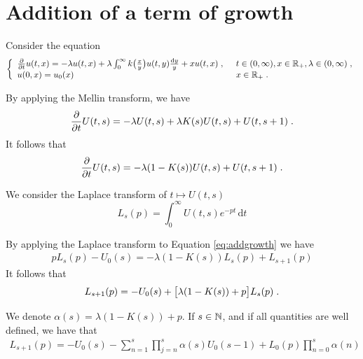 \documentclass[11pt]{amsart}
\newcommand{\diff}{\,\mathrm{d}}
\begin{document}
\section{Addition of a term of growth}

Consider the equation
\begin{equation*}\left\{
    \begin{array}{ll}
	\frac{\partial}{\partial t}u(t,x) = - \lambda u(t,x) + \lambda \int_{0}^{\infty} k\big( \frac{x}{y}\big)u(t,y) \frac{\mathrm dy}{y} + xu(t,x)
	\; , \enspace
	& t \in (0, \infty), x \in \mathbb{R}_+, \lambda \in (0, \infty) \; ,
	\\
	u(0, x) = u_0(x)
	& x \in \mathbb{R}_+
	\; .
    \end{array}
	\right.
\end{equation*}

By applying the Mellin transform, we have
	\begin{equation*}
		\frac{\partial}{\partial t} U(t,s) = - \lambda U(t,s) + \lambda K(s) U(t,s) + U(t,s+1)
		\; .
	\end{equation*}
It follows that
    \begin{equation}
        \frac{\partial}{\partial t} U(t,s) = - \lambda (1-K(s)) U(t,s) + U(t,s+1)
		\; .
        \label{eq:addgrowth}
    \end{equation}

We consider the Laplace transform of $t \mapsto U(t,s)$
$$ L_s(p) = \int_0^\infty U(t,s)e^{-pt}\diff t$$ 

By applying the Laplace transform to Equation \eqref{eq:addgrowth} we have 
\begin{align*}
    pL_s(p) - U_0(s) = -  \lambda (1-K(s)) L_s(p) + L_{s+1}(p)
\end{align*}
It follows that 
\begin{align*}
    L_{s+1}(p) = - U_0(s) + \big[\lambda (1-K(s)) + p \big]L_s(p)
    \; .
\end{align*}

\begin{remark}
We denote $\alpha(s) = \lambda (1-K(s)) + p$. If $s \in \mathbb{N}$, and if all quantities are well defined, we have that
\begin{align*}
    L_{s+1}(p) = -U_0(s) -\sum_{n = 1}^{s} \prod_{j = n}^s \alpha(s)U_0(s-1) + L_0(p) \prod_{n = 0}^{s}\alpha(n)
\end{align*}
\end{remark}



\end{document}
